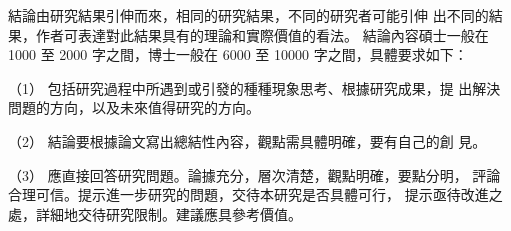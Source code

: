 結論由研究結果引伸而來，相同的研究結果，不同的研究者可能引伸
出不同的結果，作者可表達對此結果具有的理論和實際價值的看法。
結論內容碩士一般在 1000 至 2000 字之間，博士一般在 6000 至
10000 字之間，具體要求如下：

（1） 包括研究過程中所遇到或引發的種種現象思考、根據研究成果，提
出解決問題的方向，以及未來值得研究的方向。

（2） 結論要根據論文寫出總結性內容，觀點需具體明確，要有自己的創
見。

（3） 應直接回答研究問題。論據充分，層次清楚，觀點明確，要點分明，
評論合理可信。提示進一步研究的問題，交待本研究是否具體可行，
提示亟待改進之處，詳細地交待研究限制。建議應具參考價值。